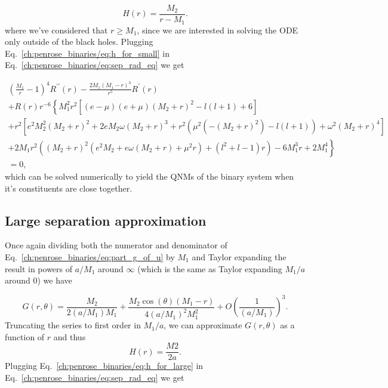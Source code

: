 \begin{equation}
  H(r) = \frac{M_2}{r - M_1}.
  \label{ch:penrose_binaries/eq:h_for_small}
\end{equation}
%
where we've considered that $r \geq M_1$, since we are interested in solving the ODE only outside of the black holes. Plugging Eq.~\eqref{ch:penrose_binaries/eq:h_for_small} in Eq.~\eqref{ch:penrose_binaries/eq:sep_rad_eq} we get

\begin{multline}
  \left(\frac{M_1}{r}-1\right)^4 R^{\prime\prime}(r) - \frac{2 M_1 (M_1-r)^3}{r^5} R^{\prime}(r) \\
  + R(r) r^{-6}\left\{ M_1^2 r^2 \left[(e-\mu ) (e+\mu ) (M_2+r)^2-l (l+1)+6\right] \right. \\
  + r^2 \left[e^2 M_2^2 (M_2+r)^2+2 e M_2 \omega  (M_2+r)^3+r^2 \left(\mu ^2 \left(-(M_2+r)^2\right)-l (l+1)\right)+\omega ^2 (M_2+r)^4\right] \\
  \left. + 2 M_1 r^2 \left((M_2+r)^2 \left(e^2 M_2+e \omega  (M_2+r)+\mu ^2 r\right)+\left(l^2+l-1\right) r\right) -6 M_1^3 r + 2 M_1^4 \right\} \\
  = 0,
  \label{ch:penrose_binaries/eq:ode_close}
\end{multline}
%
which can be solved numerically to yield the QNMs of the binary system when it's constituents are close together.

\subsection{Large separation approximation}

Once again dividing both the numerator and denominator of Eq.~\eqref{ch:penrose_binaries/eq:part_g_of_u} by $M_1$ and Taylor expanding the result in powers of $a/M_1$ around $\infty$ (which is the same as Taylor expanding $M_1/a$ around $0$) we have

\begin{equation}
  G(r,\theta) = \frac{M_2}{2 (a/M_1)  M_1} + \frac{M_2 \cos (\theta ) (M_1-r)}{4 (a/M_1) ^2 M_1^2}+O\left(\frac{1}{(a/M_1) }\right)^3.
  \label{ch:penrose_binaries/eq:g_taylor_exp_large}
\end{equation}
%
Truncating the series to first order in $M_1/a$, we can approximate $G(r,\theta)$ as a function of $r$ and thus
\begin{equation}
  H(r) = \frac{M2}{2 a}.
  \label{ch:penrose_binaries/eq:h_for_large}
\end{equation}
%
Plugging Eq.~\eqref{ch:penrose_binaries/eq:h_for_large} in Eq.~\eqref{ch:penrose_binaries/eq:sep_rad_eq} we get

